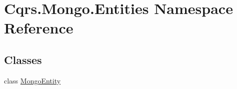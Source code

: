 \hypertarget{namespaceCqrs_1_1Mongo_1_1Entities}{}\section{Cqrs.\+Mongo.\+Entities Namespace Reference}
\label{namespaceCqrs_1_1Mongo_1_1Entities}
\subsection*{Classes}
\begin{DoxyCompactItemize}
\item 
class \hyperlink{classCqrs_1_1Mongo_1_1Entities_1_1MongoEntity}{Mongo\+Entity}
\end{DoxyCompactItemize}
